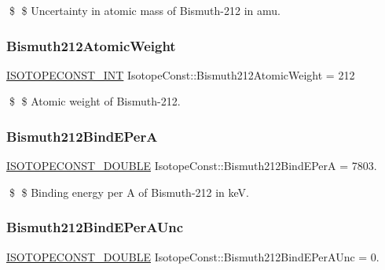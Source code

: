 \$ \$ Uncertainty in atomic mass of Bismuth-\/212 in amu. \mbox{\label{group___isotope_const-_bismuth-_bi212_gaea2af2ef0f5ace70576ce96171aeb01d}} 
\subsubsection{\texorpdfstring{Bismuth212\+Atomic\+Weight}{Bismuth212AtomicWeight}}
{\footnotesize\ttfamily \mbox{\hyperlink{group___isotope_const-_macros_ga5f18360b3e99483a35c32d789e62621c}{I\+S\+O\+T\+O\+P\+E\+C\+O\+N\+S\+T\+\_\+\+I\+NT}} Isotope\+Const\+::\+Bismuth212\+Atomic\+Weight = 212}

\$ \$ Atomic weight of Bismuth-\/212. \mbox{\label{group___isotope_const-_bismuth-_bi212_gaae6f2850ee1f10d578de8e1a13b5b29d}} 
\subsubsection{\texorpdfstring{Bismuth212\+Bind\+E\+PerA}{Bismuth212BindEPerA}}
{\footnotesize\ttfamily \mbox{\hyperlink{group___isotope_const-_macros_ga8f45a7272ce02c0b4c65c44636ed719a}{I\+S\+O\+T\+O\+P\+E\+C\+O\+N\+S\+T\+\_\+\+D\+O\+U\+B\+LE}} Isotope\+Const\+::\+Bismuth212\+Bind\+E\+PerA = 7803.}

\$ \$ Binding energy per A of Bismuth-\/212 in keV. \mbox{\label{group___isotope_const-_bismuth-_bi212_ga55a9dc693d350c0e405293791ae94fd7}} 
\subsubsection{\texorpdfstring{Bismuth212\+Bind\+E\+Per\+A\+Unc}{Bismuth212BindEPerAUnc}}
{\footnotesize\ttfamily \mbox{\hyperlink{group___isotope_const-_macros_ga8f45a7272ce02c0b4c65c44636ed719a}{I\+S\+O\+T\+O\+P\+E\+C\+O\+N\+S\+T\+\_\+\+D\+O\+U\+B\+LE}} Isotope\+Const\+::\+Bismuth212\+Bind\+E\+Per\+A\+Unc = 0.}

